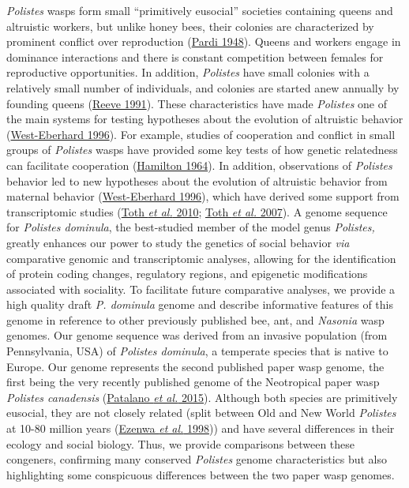 \textit{Polistes} wasps form small ``primitively eusocial'' societies
containing queens and altruistic workers, but unlike honey bees, their
colonies are characterized by prominent conflict over reproduction
(\protect\hyperlink{ux5fENREFux5f41}{Pardi 1948}). Queens and workers
engage in dominance interactions and there is constant competition
between females for reproductive opportunities. In addition,
\textit{Polistes} have small colonies with a relatively small number of
individuals, and colonies are started anew annually by founding queens
(\protect\hyperlink{ux5fENREFux5f46}{Reeve 1991}). These characteristics
have made \textit{Polistes} one of the main systems for testing hypotheses
about the evolution of altruistic behavior
(\protect\hyperlink{ux5fENREFux5f71}{West-Eberhard 1996}). For example,
studies of cooperation and conflict in small groups of \textit{Polistes}
wasps have provided some key tests of how genetic relatedness can
facilitate cooperation (\protect\hyperlink{ux5fENREFux5f17}{Hamilton
1964}). In addition, observations of \textit{Polistes} behavior led to new
hypotheses about the evolution of altruistic behavior from maternal
behavior (\protect\hyperlink{ux5fENREFux5f71}{West-Eberhard 1996}),
which have derived some support from transcriptomic studies
(\protect\hyperlink{ux5fENREFux5f62}{Toth \textit{et al.} 2010};
\protect\hyperlink{ux5fENREFux5f63}{Toth \textit{et al.} 2007}). A genome
sequence for \textit{Polistes dominula}, the best-studied member of the
model genus \textit{Polistes,} greatly enhances our power to study the
genetics of social behavior \textit{via} comparative genomic and
transcriptomic analyses, allowing for the identification of protein
coding changes, regulatory regions, and epigenetic modifications
associated with sociality. To facilitate future comparative analyses, we
provide a high quality draft \textit{P. dominula} genome and describe
informative features of this genome in reference to other previously
published bee, ant, and \textit{Nasonia} wasp genomes. Our genome sequence
was derived from an invasive population (from Pennsylvania, USA) of
\textit{Polistes dominula}, a temperate species that is native to Europe.
Our genome represents the second published paper wasp genome, the first
being the very recently published genome of the Neotropical paper wasp
\textit{Polistes canadensis} (\protect\hyperlink{ux5fENREFux5f43}{Patalano
\textit{et al.} 2015}). Although both species are primitively eusocial,
they are not closely related (split between Old and New World
\textit{Polistes} at 10-80 million years
(\protect\hyperlink{ux5fENREFux5f9}{Ezenwa \textit{et al.} 1998})) and
have several differences in their ecology and social biology. Thus, we
provide comparisons between these congeners, confirming many conserved
\textit{Polistes} genome characteristics but also highlighting some
conspicuous differences between the two paper wasp genomes.

